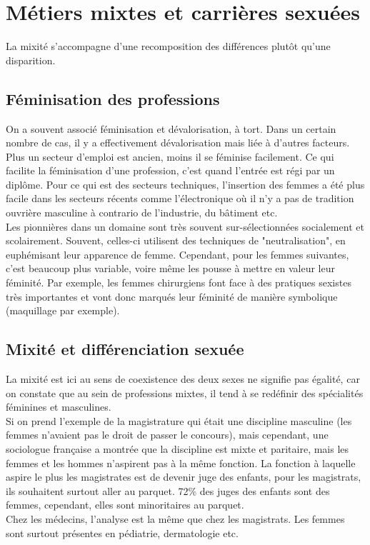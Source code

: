 \documentclass[10pt, a4paper, openany]{book}
\begin{document}
\section{Métiers mixtes et carrières sexuées}

La mixité s'accompagne d'une recomposition des différences plutôt qu'une disparition.

\subsection{Féminisation des professions}

On a souvent associé féminisation et dévalorisation, à tort. Dans un certain nombre de cas, il y a effectivement dévalorisation mais liée à d'autres facteurs. \\
Plus un secteur d'emploi est ancien, moins il se féminise facilement. Ce qui facilite la féminisation d'une profession, c'est quand l'entrée est régi par un diplôme. Pour ce qui est des secteurs techniques, l'insertion des femmes a été plus facile dans les secteurs récents comme l'électronique où il n'y a pas de tradition ouvrière masculine à contrario de l'industrie, du bâtiment etc. \\
Les pionnières dans un domaine sont très souvent sur-sélectionnées socialement et scolairement. Souvent, celles-ci utilisent des techniques de "neutralisation", en euphémisant leur apparence de femme. Cependant, pour les femmes suivantes, c'est beaucoup plus variable, voire même les pousse à mettre en valeur leur féminité. Par exemple, les femmes chirurgiens font face à des pratiques sexistes très importantes et vont donc marqués leur féminité de manière symbolique (maquillage par exemple). 

\subsection{Mixité et différenciation sexuée}

La mixité est ici au sens de coexistence des deux sexes ne signifie pas égalité, car on constate que au sein de professions mixtes, il tend à se redéfinir des spécialités féminines et masculines. \\
Si on prend l'exemple de la magistrature qui était une discipline masculine (les femmes n'avaient pas le droit de passer le concours), mais cependant, une sociologue française a montrée que la discipline est mixte et paritaire, mais les femmes et les hommes n'aspirent pas à la même fonction. La fonction à laquelle aspire le plus les magistrates est de devenir juge des enfants, pour les magistrats, ils souhaitent surtout aller au parquet. 72\% des juges des enfants sont des femmes, cependant, elles sont minoritaires au parquet. \\
Chez les médecins, l'analyse est la même que chez les magistrats. Les femmes sont surtout présentes en pédiatrie, dermatologie etc.
\end{document}
